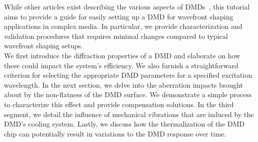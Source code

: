 \documentclass[12pt]{iopart}
\begin{document}
While other articles exist describing the various aspects of DMDs~\cite{Park2015properties, Scholes2019structured, Cox2021converting, Wang2023diffraction},
this tutorial aims to provide a guide for easily setting up a DMD for wavefront shaping applications in complex media.
In particular, we provide characterization and validation procedures that requires minimal changes compared to typical wavefront shaping setups.\\
We first introduce the diffraction properties of a DMD
and elaborate on how these could impact the system's efficiency.
We also furnish a straightforward criterion for selecting the appropriate DMD parameters for a specified excitation wavelength.
In the next section,
we delve into the aberration impacts brought about by the non-flatness of the DMD surface.
We demonstrate a simple process to characterize this effect and provide compensation solutions.
In the third segment,
we detail the influence of mechanical vibrations that are induced by the DMD's cooling system.
Lastly, we discuss how the thermalization of the DMD chip can potentially result in variations to the DMD response over time.
\end{document}
